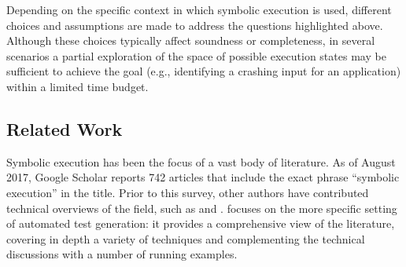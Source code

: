 \begin{itemize}[itemsep=1mm]
\end{itemize}

\noindent Depending on the specific context in which symbolic execution is used, different choices and assumptions are made to address the questions highlighted above. Although these choices typically affect soundness or completeness, in several scenarios a partial exploration of the space of possible execution states may be sufficient to achieve the goal (e.g., identifying a crashing input for an application) within a limited time budget.



\subsection{Related Work}
\label{ss:related-surveys}

Symbolic execution has been the focus of a vast body of literature. As of August 2017, Google Scholar reports 742 articles that include the exact phrase ``symbolic execution'' in the title. Prior to this survey, other authors have contributed technical overviews of the field, such as \cite{PV-JSTTT09} and \cite{CS-CACM13}. \cite{CHEN20131758} focuses on the more specific setting of automated test generation: it provides a comprehensive view of the literature, covering in depth a variety of techniques and complementing the technical discussions with a number of running examples.

